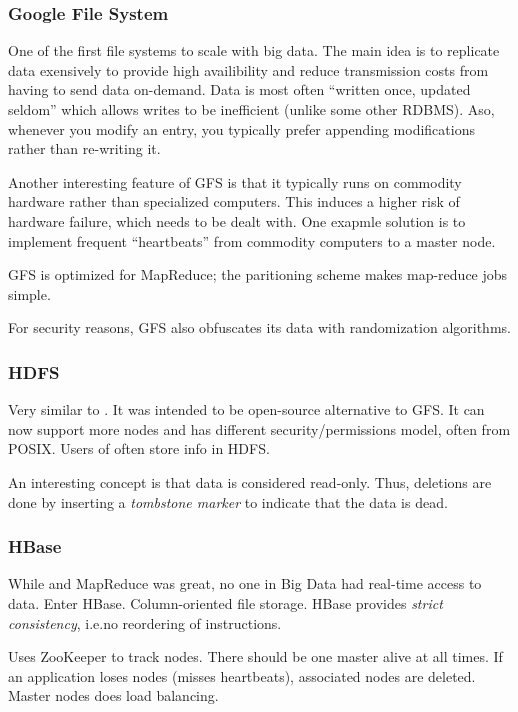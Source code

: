 \subsubsection{Google File System}\label{sec:GFS}
One of the first file systems to scale with big data. The main idea is to replicate data
exensively to provide high availibility and reduce transmission costs from having to send data on-demand.
Data is most often ``written once, updated seldom'' which allows writes to be inefficient (unlike some other RDBMS). Aso, whenever you modify an entry, you typically prefer appending modifications rather than re-writing it.

Another interesting feature of GFS is that it typically runs on commodity hardware rather than
specialized computers. This induces a higher risk of hardware failure, which needs to be dealt with.
One exapmle solution is to implement frequent ``heartbeats'' from commodity computers to a master node.

GFS is optimized for MapReduce; the paritioning scheme makes map-reduce jobs simple.

For security reasons, GFS also obfuscates its data with randomization algorithms.

\subsubsection{HDFS}\label{sec:HDFS}
Very similar to . It was intended to be open-source alternative to GFS.\@
It can now support more nodes and has different security/permissions model, often from POSIX.
Users of  often store info in HDFS.

An interesting concept is that data is considered read-only. Thus, deletions are
done by inserting a \textit{tombstone marker} to indicate that the data is dead.

\subsubsection{HBase}\label{sec:HBase}
While  and MapReduce was great, no one in Big Data
had real-time access to data. Enter HBase. Column-oriented file storage.
HBase provides \textit{strict consistency}, i.e.\@ no reordering of instructions.

Uses ZooKeeper to track nodes. There should be one master alive at all times.
If an application loses nodes (misses heartbeats), associated nodes are deleted.
Master nodes does load balancing.

